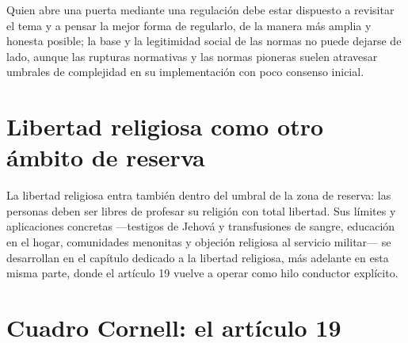 \documentclass[12pt,oneside]{book}
\begin{document}
Quien abre una puerta mediante una regulación debe estar dispuesto a revisitar el tema y a pensar la mejor forma de regularlo, de la manera más amplia y honesta posible; la base y la legitimidad social de las normas no puede dejarse de lado, aunque las rupturas normativas y las normas pioneras suelen atravesar umbrales de complejidad en su implementación con poco consenso inicial.

\section{Libertad religiosa como otro ámbito de reserva}

La libertad religiosa entra también dentro del umbral de la zona de reserva: las personas deben ser libres de profesar su religión con total libertad. Sus límites y aplicaciones concretas ---testigos de Jehová y transfusiones de sangre, educación en el hogar, comunidades menonitas y objeción religiosa al servicio militar--- se desarrollan en el capítulo dedicado a la libertad religiosa, más adelante en esta misma parte, donde el artículo 19 vuelve a operar como hilo conductor explícito.

\section{Cuadro Cornell: el artículo 19}
\end{document}
